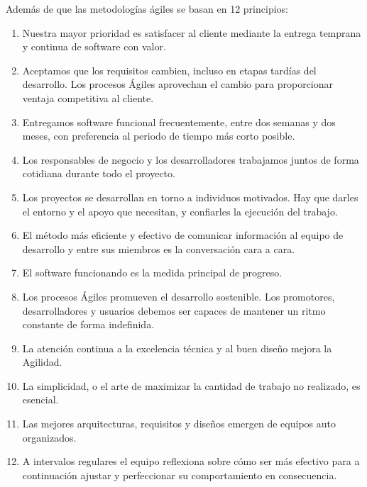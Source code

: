     Además de que las metodologías ágiles se basan en 12 principios\cite{AgilePrinciples}:
    
    \begin{enumerate}
        \item Nuestra mayor prioridad es satisfacer al cliente mediante la entrega temprana y continua de software con valor. \cite{AgilePrinciples}

        \item Aceptamos que los requisitos cambien, incluso en etapas tardías del desarrollo. Los procesos Ágiles aprovechan el cambio para proporcionar ventaja competitiva al cliente. \cite{AgilePrinciples}

        \item Entregamos software funcional frecuentemente, entre dos semanas y dos meses, con preferencia al periodo de tiempo más corto posible. \cite{AgilePrinciples}

        \item Los responsables de negocio y los desarrolladores trabajamos juntos de forma cotidiana durante todo el proyecto. \cite{AgilePrinciples}

        \item Los proyectos se desarrollan en torno a individuos motivados. Hay que darles el entorno y el apoyo que necesitan, y confiarles la ejecución del trabajo. \cite{AgilePrinciples}

        \item El método más eficiente y efectivo de comunicar información al equipo de desarrollo y entre sus miembros es la conversación cara a cara. \cite{AgilePrinciples}

        \item El software funcionando es la medida principal de progreso. \cite{AgilePrinciples}

        \item Los procesos Ágiles promueven el desarrollo sostenible. Los promotores, desarrolladores y usuarios debemos ser capaces de mantener un ritmo constante de forma indefinida. \cite{AgilePrinciples}

        \item La atención continua a la excelencia técnica y al buen diseño mejora la Agilidad. \cite{AgilePrinciples}

        \item La simplicidad, o el arte de maximizar la cantidad de trabajo no realizado, es esencial. \cite{AgilePrinciples}

        \item Las mejores arquitecturas, requisitos y diseños emergen de equipos auto organizados. \cite{AgilePrinciples}
        
        \item A intervalos regulares el equipo reflexiona sobre cómo ser más efectivo para a continuación ajustar y perfeccionar su comportamiento en consecuencia. \cite{AgilePrinciples}
    \end{enumerate}
    
